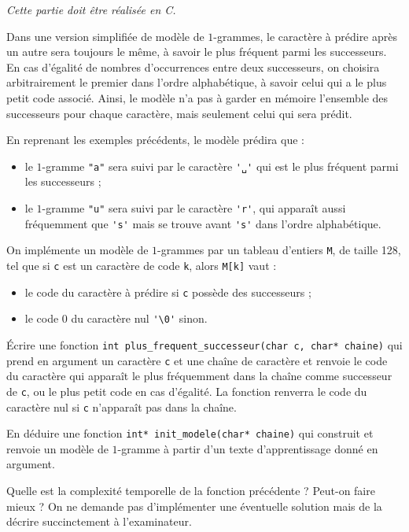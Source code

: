 \documentclass[10pt]{article}
\begin{document}
\textit{Cette partie doit être réalisée en C.}

Dans une version simplifiée de modèle de $1$-grammes, le caractère à prédire après un autre sera toujours le même, à savoir le plus fréquent parmi les successeurs. En cas d'égalité de nombres d'occurrences entre deux successeurs, on choisira arbitrairement le premier dans l'ordre alphabétique, à savoir celui qui a le plus petit code associé. Ainsi, le modèle n'a pas à garder en mémoire l'ensemble des successeurs pour chaque caractère, mais seulement celui qui sera prédit.

En reprenant les exemples précédents, le modèle prédira que :
\begin{itemize}
\item le $1$-gramme \verb|"a"| sera suivi par le caractère \verb|'␣'| qui est le plus fréquent parmi les successeurs ;
\item le $1$-gramme \verb|"u"| sera suivi par le caractère \verb|'r'|, qui apparaît aussi fréquemment que \verb|'s'| mais se trouve avant \verb|'s'| dans l'ordre alphabétique.
\end{itemize}

On implémente un modèle de $1$-grammes par un tableau d'entiers \verb"M", de taille 128, tel que si \verb"c" est un caractère de code \verb"k", alors \verb"M[k]" vaut :
\begin{itemize}
\item le code du caractère à prédire si \verb"c" possède des successeurs ;
\item le code $0$ du caractère nul \verb"'\0'" sinon.
\end{itemize}

\begin{Exercise}
Écrire une fonction \verb"int plus_frequent_successeur(char c, char* chaine)" qui prend en argument un caractère \verb"c" et une chaîne de caractère et renvoie le code du caractère qui apparaît le plus fréquemment dans la chaîne comme successeur de \verb"c", ou le plus petit code en cas d'égalité. La fonction renverra le code du caractère nul si \verb"c" n'apparaît pas dans la chaîne.
\end{Exercise}

\begin{Exercise}
En déduire une fonction \verb"int* init_modele(char* chaine)" qui construit et renvoie un modèle de $1$-gramme à partir d'un texte d'apprentissage donné en argument.
\end{Exercise}

\begin{Exercise}
Quelle est la complexité temporelle de la fonction précédente ? Peut-on faire mieux ? On ne demande pas d'implémenter une éventuelle solution mais de la décrire succinctement à l'examinateur.
\end{Exercise}
\end{document}
